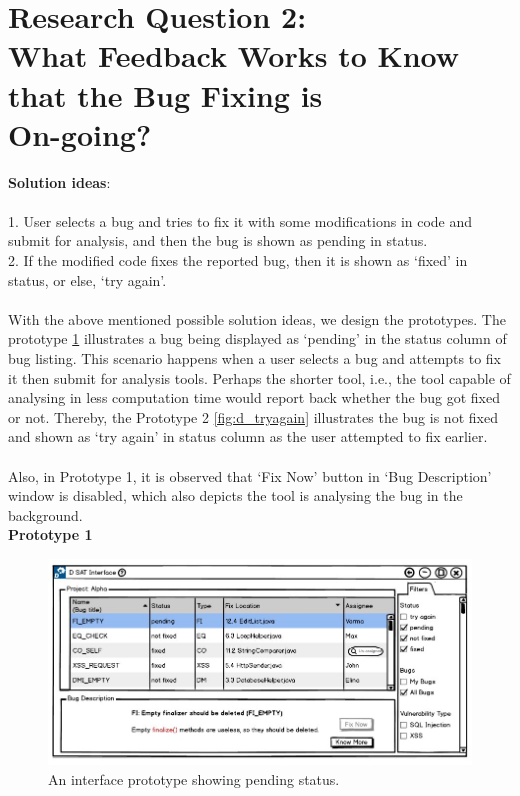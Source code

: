 \section{Research Question 2: \\ What Feedback Works to Know that the Bug Fixing is	\\ On-going?}

\textbf{Solution ideas}: \\ \\


1. User selects a bug and tries to fix it with some modifications in code and submit for analysis, and then the bug is shown as pending in status. \\
2. If the modified code fixes the reported bug, then it is shown as ‘fixed’ in status, or else, ‘try again’. \\ \\

With the above mentioned possible solution ideas, we design the prototypes. The prototype \ref{fig:d_pending} illustrates a bug being displayed as ‘pending’ in the status column of bug listing. This scenario happens when a user selects a bug and attempts to fix it then submit for analysis tools. Perhaps the shorter tool, i.e., the tool capable of analysing in less computation time would report back whether the bug got fixed or not. Thereby, the Prototype 2 \ref{fig:d_tryagain} illustrates the bug is not fixed and shown as ‘try again’ in status column as the user attempted to fix earlier. \\ \\

Also, in Prototype 1, it is observed that ‘Fix Now’ button in ‘Bug Description’ window is disabled, which also depicts the tool is analysing the bug in the background. \\

\textbf{Prototype 1}

\begin{figure}[hbt!]
	\centering
	\includegraphics[width=\linewidth]{figures/d_pending}
	\caption{An interface prototype showing pending status.}
	\label{fig:d_pending}
\end{figure}


